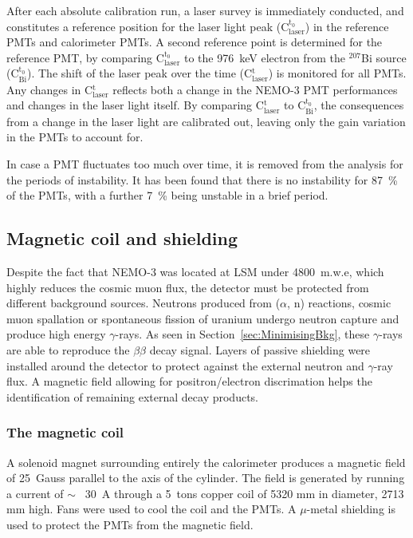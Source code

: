 \documentclass[main.tex]{subfiles}
\begin{document}
\bigskip


\NI After each absolute calibration run, a laser survey is immediately conducted, and constitutes a reference position for the laser light peak (C$^{\text{t}_\text{0}}_{\text{laser}}$) in the reference PMTs and calorimeter PMTs. A second reference point is determined for the reference PMT, by comparing C$^{\text{t}_\text{0}}_{\text{laser}}$ to the 976~keV electron from the $^{\text{207}}$Bi source (C$^{\text{t}_\text{0}}_{\text{Bi}}$). The shift of the laser peak over the time (C$^{\text{t}}_{\text{laser}}$) is monitored for all PMTs. Any changes in C$^{\text{t}}_{\text{laser}}$ reflects both a change in the NEMO-3 PMT performances and changes in the laser light itself. By comparing C$^{\text{t}}_{\text{laser}}$ to C$^{\text{t}_\text{0}}_{\text{Bi}}$, the consequences from a change in the laser light are calibrated out, leaving only the gain variation in the PMTs to account for.


\bigskip


\NI In case a PMT fluctuates too much over time, it is removed from the analysis for the periods of instability. It has been found that there is no instability for 87~\% of the PMTs, with a further 7~\% being unstable in a brief period.

\subsection{Magnetic coil and shielding}


\NI Despite the fact that NEMO-3 was located at LSM under 4800~m.w.e, which highly reduces the cosmic muon flux, the detector must be protected from different background sources. Neutrons produced from ($\alpha$, n) reactions, cosmic muon spallation or spontaneous fission of uranium undergo neutron capture and produce high energy $\gamma$-rays. As seen in Section~\ref{sec:MinimisingBkg}, these $\gamma$-rays are able to reproduce the $\beta\beta$ decay signal. Layers of passive shielding were installed around the detector to protect against the external neutron and $\gamma$-ray flux. A magnetic field allowing for positron/electron discrimation helps the identification of remaining external decay products.


\subsubsection{The magnetic coil}


\NI A solenoid magnet surrounding entirely the calorimeter produces a magnetic field of 25~Gauss parallel to the axis of the cylinder. The field is generated by running a current of $\sim$~ 30~A through a 5~tons copper coil of 5320 mm in diameter, 2713 mm high. Fans were used to cool the coil and the PMTs. A $\mu$-metal shielding is used to protect the PMTs from the magnetic field. 
\end{document}
